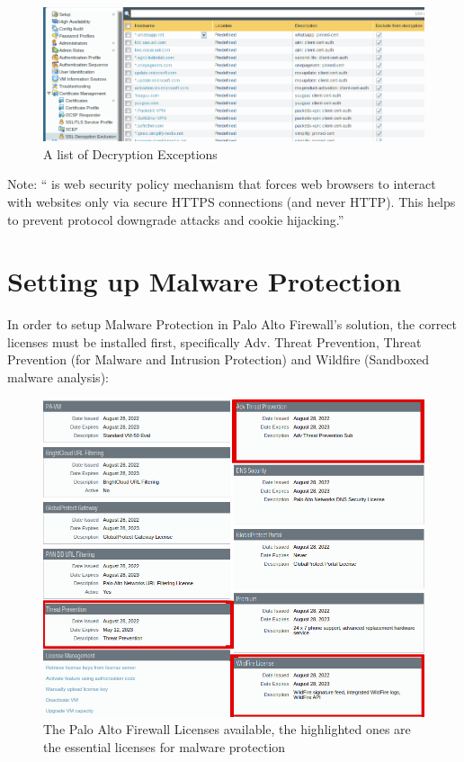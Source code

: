 \begin{figure}[!h]
\centering
 \includegraphics[width=12cm]{img/decryption_exceptions.png}
	\caption{A list of Decryption Exceptions}\label{Decryption Exceptions}
\end{figure}

\begin{center}
 Note: `` is web security policy mechanism that forces web browsers to interact with websites only via secure HTTPS connections (and never HTTP). This helps to prevent protocol downgrade attacks and cookie hijacking.''\cite{hsts-alto}
\end{center}


\newpage

\section{Setting up Malware Protection}

In order to setup Malware Protection in Palo Alto Firewall's solution, the correct licenses must be installed first, specifically Adv. Threat Prevention, Threat Prevention (for Malware and Intrusion Protection) and Wildfire (Sandboxed malware analysis):

\begin{figure}[h!]
 \centering
 \includegraphics[width=13.5cm]{img/PAN_Licenses.png}
 \caption{The Palo Alto Firewall Licenses available, the highlighted ones are the essential licenses for malware protection}
 \label{fig: PanOS Licenses}
\end{figure}

